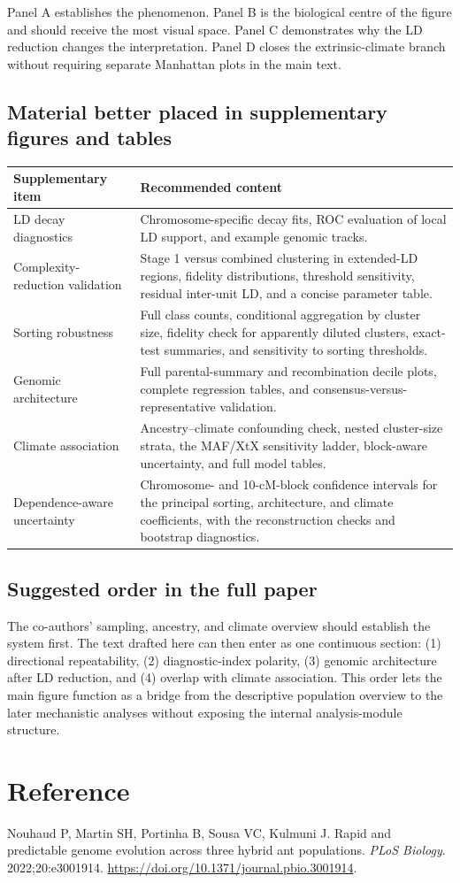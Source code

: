 \documentclass[11pt]{article}
\begin{document}
Panel A establishes the phenomenon. Panel B is the biological centre of the
figure and should receive the most visual space. Panel C demonstrates why the
LD reduction changes the interpretation. Panel D closes the extrinsic-climate
branch without requiring separate Manhattan plots in the main text.

\subsection*{Material better placed in supplementary figures and tables}

\begin{tabular}{>{\raggedright\arraybackslash}p{}
                >{\raggedright\arraybackslash}p{}}
\toprule
Supplementary item & Recommended content \\
\midrule
LD decay diagnostics &
Chromosome-specific decay fits, ROC evaluation of local LD support, and
example genomic tracks. \\
\addlinespace
Complexity-reduction validation &
Stage 1 versus combined clustering in extended-LD regions, fidelity
distributions, threshold sensitivity, residual inter-unit LD, and a concise
parameter table. \\
\addlinespace
Sorting robustness &
Full class counts, conditional aggregation by cluster size, fidelity check for
apparently diluted clusters, exact-test summaries, and sensitivity to sorting
thresholds. \\
\addlinespace
Genomic architecture &
Full parental-summary and recombination decile plots, complete regression
tables, and consensus-versus-representative validation. \\
\addlinespace
Climate association &
Ancestry--climate confounding check, nested cluster-size strata, the MAF/XtX
sensitivity ladder, block-aware uncertainty, and full model tables. \\
\addlinespace
Dependence-aware uncertainty &
Chromosome- and 10-cM-block confidence intervals for the principal sorting,
architecture, and climate coefficients, with the reconstruction checks and
bootstrap diagnostics. \\
\bottomrule
\end{tabular}

\subsection*{Suggested order in the full paper}

The co-authors' sampling, ancestry, and climate overview should establish the
system first. The text drafted here can then enter as one continuous section:
(1) directional repeatability, (2) diagnostic-index polarity, (3) genomic
architecture after LD reduction, and (4) overlap with climate association.
This order lets the main figure function as a bridge from the descriptive
population overview to the later mechanistic analyses without exposing the
internal analysis-module structure.

\section*{Reference}

Nouhaud P, Martin SH, Portinha B, Sousa VC, Kulmuni J. Rapid and predictable
genome evolution across three hybrid ant populations. \textit{PLoS Biology}.
2022;20:e3001914. \url{https://doi.org/10.1371/journal.pbio.3001914}.
\end{document}
